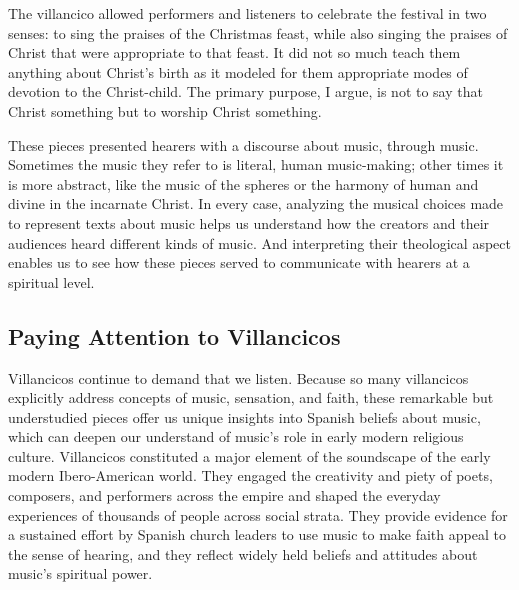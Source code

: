The villancico allowed performers and listeners to celebrate the festival in two
senses: to sing the praises of the Christmas feast, while also singing the
praises of Christ that were appropriate to that feast. 
It did not so much teach them anything about Christ's birth as it modeled for
them appropriate modes of devotion to the Christ-child.
The primary purpose, I argue, is not to say that Christ  something but
to worship Christ  something.

These pieces presented hearers with a discourse about music, through music.
Sometimes the music they refer to is literal, human music-making; other times
it is more abstract, like the music of the spheres or the harmony of human and
divine in the incarnate Christ.
In every case, analyzing the musical choices made to represent texts about
music helps us understand how the creators and their audiences heard different
kinds of music.
And interpreting their theological aspect enables us to see how these pieces
served to communicate with hearers at a spiritual level.

\subsection{Paying Attention to Villancicos}

Villancicos continue to demand that we listen. 
Because so many villancicos explicitly address concepts of music, sensation,
and faith, these remarkable but understudied pieces offer us unique insights
into Spanish beliefs about music, which can deepen our understand of music's
role in early modern religious culture.
Villancicos constituted a major element of the soundscape of the
early modern Ibero-American world.
They engaged the creativity and piety of poets, composers, and performers
across the empire and shaped the everyday experiences of thousands of people
across social strata.
They provide evidence for a sustained effort by Spanish church leaders to use
music to make faith appeal to the sense of hearing, and they reflect widely
held beliefs and attitudes about music's spiritual power.

